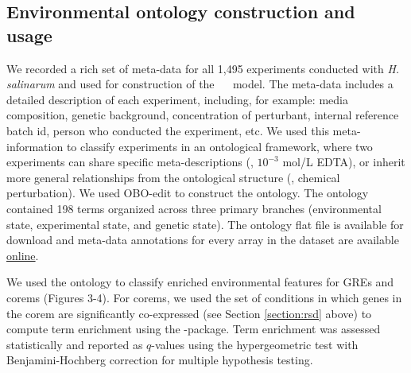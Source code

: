 \subsection{Environmental ontology construction and usage}

We recorded a rich set of meta-data for all 1,495 experiments
conducted with {\it H. salinarum} and used for construction of the
\halo~ \egrine~model. The meta-data includes a detailed description
of each experiment, including, for example: media composition, genetic
background, concentration of perturbant, internal reference batch id,
person who conducted the experiment, etc. We used this
meta-information to classify experiments in an ontological framework,
where two experiments can share specific meta-descriptions (\eg,
$10^{-3}$ mol/L EDTA), or inherit more general relationships from the
ontological structure (\eg, chemical perturbation). We used OBO-edit
\cite{Day-Richter2007} to construct the ontology. The ontology contained 198
terms organized across three primary branches (environmental state,
experimental state, and genetic state). The ontology flat file is
available for download and meta-data annotations for every array in
the dataset are available \href{http://egrin2.systemsbiology.net}{online}.

We used the ontology to classify enriched environmental features for
GREs and corems (Figures 3-4). For corems, we used the set of
conditions in which genes in the corem are significantly co-expressed
(see Section \ref{section:rsd} above) to compute term enrichment using the 
\cite{Kurbatova2011}  -package. Term enrichment was assessed
statistically and reported as $q$-values using the hypergeometric test
with Benjamini-Hochberg correction for multiple hypothesis testing.

